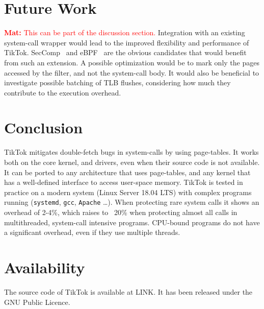 \documentclass[conference]{IEEEtran}
\newcommand{\mat}[1]{\textcolor{red}{\textbf{Mat:} #1}}
\newcommand{\sysname}{TikTok}
\begin{document}
\section{Future Work}
\label{sec:furtherwork}
\mat{This can be part of the discussion section.}
Integration with an existing system-call wrapper would lead to the improved
flexibility and performance of \sysname. SecComp~\cite{seccomp} and
eBPF~\cite{ebpf} are the obvious candidates that would benefit from such an
extension. A possible optimization would be to mark only the pages accessed by
the filter, and not the system-call body. It would also be beneficial to
investigate possible batching of TLB flushes, considering how much they
contribute to the execution overhead.

\section{Conclusion}

\sysname{} mitigates double-fetch bugs in system-calls by using page-tables. It
works both on the core kernel, and drivers, even when their source code is not
available. It can be ported to any architecture that uses page-tables, and any
kernel that has a well-defined interface to access user-space memory. \sysname
is tested in practice on a modern system (Linux Server 18.04 LTS) with complex
programs running (\texttt{systemd}, \texttt{gcc}, \texttt{Apache} \ldots). When
protecting rare system calls it shows an overhead of 2-4\%, which raises to
~20\% when protecting almost all calls in multithreaded, system-call intensive
programs. CPU-bound programs do not have a significant overhead, even if they
use multiple threads.

\section*{Availability}

The source code of TikTok is available at LINK. It has been released under the
GNU Public Licence.




\end{document}
